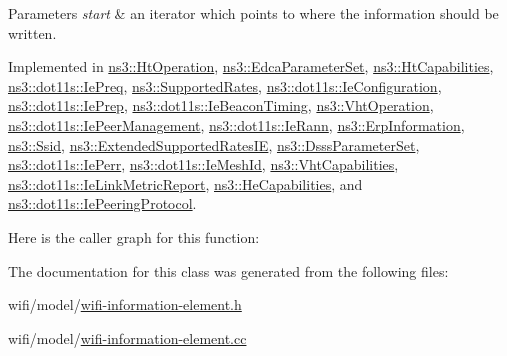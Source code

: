 \begin{DoxyParams}{Parameters}
{\em start} & an iterator which points to where the information should be written. \\
\hline
\end{DoxyParams}


Implemented in \hyperlink{classns3_1_1HtOperation_a65fccd065c260f9eb3b93fa0f84ee337}{ns3\+::\+Ht\+Operation}, \hyperlink{classns3_1_1EdcaParameterSet_a685967c8b646f0f6d5a057d7fccd9859}{ns3\+::\+Edca\+Parameter\+Set}, \hyperlink{classns3_1_1HtCapabilities_ad4efe09efb638c5e75f32a2c77551476}{ns3\+::\+Ht\+Capabilities}, \hyperlink{classns3_1_1dot11s_1_1IePreq_a63f72243f43a80199b2016ffc736f932}{ns3\+::dot11s\+::\+Ie\+Preq}, \hyperlink{classns3_1_1SupportedRates_a40aa2349e55ae039a5d8f2293057a57d}{ns3\+::\+Supported\+Rates}, \hyperlink{classns3_1_1dot11s_1_1IeConfiguration_afdfb82928ec50689bd74a5f8bc3a880f}{ns3\+::dot11s\+::\+Ie\+Configuration}, \hyperlink{classns3_1_1dot11s_1_1IePrep_a69797a9a6526e0be57e1048aacaca364}{ns3\+::dot11s\+::\+Ie\+Prep}, \hyperlink{classns3_1_1dot11s_1_1IeBeaconTiming_adb0b280c030851b413eec4df6ec4e0a9}{ns3\+::dot11s\+::\+Ie\+Beacon\+Timing}, \hyperlink{classns3_1_1VhtOperation_a7e9f6a7be5da2ce7d61ebb142bc1a231}{ns3\+::\+Vht\+Operation}, \hyperlink{classns3_1_1dot11s_1_1IePeerManagement_a32e95e044d5eb1b54c15845b48009730}{ns3\+::dot11s\+::\+Ie\+Peer\+Management}, \hyperlink{classns3_1_1dot11s_1_1IeRann_adc18929d199e5d029cf6fd2c22d792eb}{ns3\+::dot11s\+::\+Ie\+Rann}, \hyperlink{classns3_1_1ErpInformation_a9ebf40cbe30a80a09bcae8f130252d67}{ns3\+::\+Erp\+Information}, \hyperlink{classns3_1_1Ssid_a92e1ad0b067f1fd585ba4b8395fe3a22}{ns3\+::\+Ssid}, \hyperlink{classns3_1_1ExtendedSupportedRatesIE_aaf03b8e934437fdd9a7d9d69f49adb26}{ns3\+::\+Extended\+Supported\+Rates\+IE}, \hyperlink{classns3_1_1DsssParameterSet_a885d1786dd164581bc1def2ca535e53f}{ns3\+::\+Dsss\+Parameter\+Set}, \hyperlink{classns3_1_1dot11s_1_1IePerr_a22782a754453641128314cb87a01ba39}{ns3\+::dot11s\+::\+Ie\+Perr}, \hyperlink{classns3_1_1dot11s_1_1IeMeshId_acf452ad73ebdf75b12fc80862fd532a2}{ns3\+::dot11s\+::\+Ie\+Mesh\+Id}, \hyperlink{classns3_1_1VhtCapabilities_aa58afc40bda6d6d0c7c25f7d138fb34e}{ns3\+::\+Vht\+Capabilities}, \hyperlink{classns3_1_1dot11s_1_1IeLinkMetricReport_a8386e67aadcaa1e455cf7e1c06d47017}{ns3\+::dot11s\+::\+Ie\+Link\+Metric\+Report}, \hyperlink{classns3_1_1HeCapabilities_a68225cd20307319d11a976ce9da3c4b2}{ns3\+::\+He\+Capabilities}, and \hyperlink{classns3_1_1dot11s_1_1IePeeringProtocol_a55bf9bfff96b6a67488c2aa9f0d5b4f9}{ns3\+::dot11s\+::\+Ie\+Peering\+Protocol}.



Here is the caller graph for this function\+:




The documentation for this class was generated from the following files\+:\begin{DoxyCompactItemize}
\item 
wifi/model/\hyperlink{wifi-information-element_8h}{wifi-\/information-\/element.\+h}\item 
wifi/model/\hyperlink{wifi-information-element_8cc}{wifi-\/information-\/element.\+cc}\end{DoxyCompactItemize}
